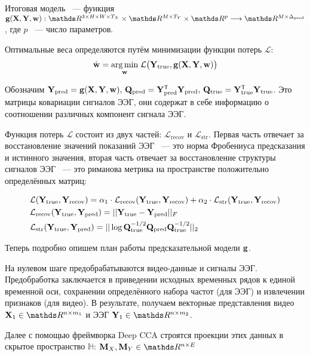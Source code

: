 \documentclass[a4paper, 12pt]{article}
\begin{document}
Итоговая модель ~--- функция $\bg(\bX, \bY, \bw): \dR^{3 \times H \times W \times T_X} \times \dR^{M \times T_Y} \times \dR^p \longrightarrow \dR^{M \times \Delta_{\text{pred}}}$, где $p$ ~--- число параметров.

Оптимальные веса определяются путём минимизации функции потерь $\mathcal{L}$:
$$\hat{\mathbf{w}} = \underset{\mathbf{w}}{\arg \min } \; \mathcal{L} \bigl( \mathbf{Y}_{\text{true}}, \mathbf{g}(\mathbf{X}, \mathbf{Y}, \mathbf{w}) \bigr) $$

Обозначим $\mathbf{Y}_{\text{pred}} = \mathbf{g}(\mathbf{X}, \mathbf{Y}, \mathbf{w}), \, \mathbf{Q}_{\text{pred}} = \mathbf{Y}_{\text{pred}}^{\mathsf{T}} \mathbf{Y}_{\text{pred}}, \, \mathbf{Q}_{\text{true}} = \mathbf{Y}_{\text{true}}^{\mathsf{T}} \mathbf{Y}_{\text{true}}$. Это матрицы ковариации сигналов ЭЭГ, они содержат в себе информацию о соотношении различных компонент сигнала ЭЭГ.

Функция потерь $\mathcal{L}$ состоит из двух частей: $\mathcal{L}_{\text{recov}}$ и $\mathcal{L}_{\text{str}}$.
Первая часть отвечает за восстановление значений показаний ЭЭГ ~--- это норма Фробениуса предсказания и истинного значения, вторая часть отвечает за восстановление структуры сигналов ЭЭГ ~--- это риманова метрика на пространстве положительно определённых матриц:

\begin{align*}
	&\mathcal{L}(\mathbf{Y}_{\text{true}}, \mathbf{Y}_{\text{recov}}) = \alpha_1 \cdot \mathcal{L}_{\text{recov}}(\mathbf{Y}_{\text{true}}, \mathbf{Y}_{\text{recov}}) + \alpha_2 \cdot \mathcal{L}_{\text{str}}(\mathbf{Y}_{\text{true}}, \mathbf{Y}_{\text{recov}}) \\
	&\mathcal{L}_{\text{recov}}(\mathbf{Y}_{\text{true}}, \mathbf{Y}_{\text{pred}}) = || \mathbf{Y}_{\text{true}} - \mathbf{Y}_{\text{pred}} ||_F \\
	&\mathcal{L}_{\text{str}}(\mathbf{Y}_{\text{true}}, \mathbf{Y}_{\text{pred}}) = || \log \mathbf{Q}_{\text{true}}^{-1/2}\mathbf{Q}_{\text{pred}}\mathbf{Q}_{\text{true}}^{-1/2}||_2
\end{align*}

Теперь подробно опишем план работы предсказательной модели $\mathbf{g}$.

На нулевом шаге предобрабатываются видео-данные и сигналы ЭЭГ. Предобработка заключается в приведении исходных временных рядов к единой временной оси, сохранении определённого набора частот (для ЭЭГ) и извлечении признаков (для видео). В результате, получаем векторные представления видео $\bX_1 \in \dR^{n \times m_1}$ и ЭЭГ $\bY_1 \in \dR^{n \times m_2}$.

Далее с помощью фреймворка Deep CCA строятся проекции этих данных в скрытое пространство $\mathds{H}$: $\bM_X, \bM_Y \in \dR^{n \times E}$
\end{document}
